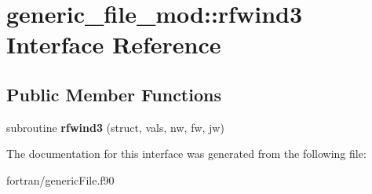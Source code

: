 \hypertarget{interfacegeneric__file__mod_1_1rfwind3}{}\section{generic\+\_\+file\+\_\+mod\+:\+:rfwind3 Interface Reference}
\label{interfacegeneric__file__mod_1_1rfwind3}
\subsection*{Public Member Functions}
\begin{DoxyCompactItemize}
\item 
\mbox{\label{interfacegeneric__file__mod_1_1rfwind3_afa23d0f51021de508c1c1c4efecba648}} 
subroutine {\bfseries rfwind3} (struct, vals, nw, fw, jw)
\end{DoxyCompactItemize}


The documentation for this interface was generated from the following file\+:\begin{DoxyCompactItemize}
\item 
fortran/generic\+File.\+f90\end{DoxyCompactItemize}
